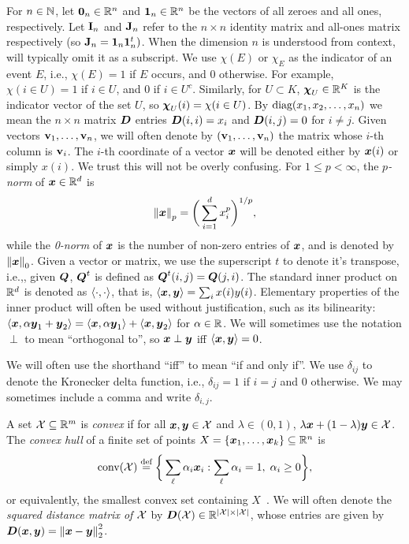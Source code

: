 For $n\in \mathbb{N}$, let $\vb{0}_n\in\mathbb{R}^n$ and $\vb{1}_n\in\mathbb{R}^n$ be the vectors of all zeroes and all ones, respectively. Let $\vb{I}_n$ and $\vb{J}_n$  refer to the $n\times n$ identity matrix and all-ones matrix respectively (so $\vb{J}_n=\vb{1}_n\vb{1}_n^t)$. When the dimension $n$ is understood from context, will typically omit it as a subscript. We use $\chi(E)$ or $\chi_E$ as the indicator of an event $E$, i.e., $\chi(E)=1$ if $E$ occurs, and 0 otherwise. For example, $\chi(i\in U)=1$ if $i\in U$, and 0 if $i\in U^c$.  Similarly, for $U\subset K$,  $\boldsymbol{\chi}_U\in\mathbb{R}^K$ is the indicator vector of the set $U$, so $\boldsymbol{\chi}_U(i)=\chi(i\in U)$. 
By $\text{diag}(x_1,x_2,\dots,x_n)$ we mean the $n\times n$ matrix $\vb*{D}$ entries $\vb*{D}(i,i)=x_i$ and $\vb*{D}(i,j)=0$ for $i\neq j$. Given vectors $\vb{v}_1,\dots,\vb{v}_n$, we will often denote by $(\vb{v}_1,\dots,\vb{v}_n)$ the matrix whose $i$-th column is $\vb{v}_i$. The $i$-th coordinate of a vector $\vb*{x}$ will be denoted either by $\vb*{x}(i)$ or simply $x(i)$. We trust this will not be overly confusing.  For $1\leq p<\infty$, the \emph{$p$-norm} of $\vb*{x}\in \mathbb{R}^d$ is 
\begin{equation}
\label{eq:pnorm}
\norm{\vb*{x}}_p = \bigg(\sum_{i=1}^d x_i^p\bigg)^{1/p},
\end{equation}
while the \emph{0-norm} of $\vb*{x}$ is the number of non-zero entries of $\vb*{x}$, and is denoted by $\norm{\vb*{x}}_0$.  Given a vector or matrix, we use the superscript $t$ to denote it's transpose, i.e.,, given $\vb*{Q}$, $\vb*{Q}^t$ is defined as $\vb*{Q}^t(i,j) = \vb*{Q}(j,i)$. The standard inner product on $\mathbb{R}^d$ is denoted as $\langle\cdot,\cdot\rangle$, that is, $\langle \vb*{x},\vb*{y}\rangle = \sum_i x(i)y(i)$. Elementary properties of the inner product will often be used without justification, such as its bilinearity: $\langle \vb*{x},\alpha\vb*{y}_1+\vb*{y}_2\rangle  = \langle \vb*{x},\alpha\vb*{y}_1\rangle + \langle \vb*{x},\vb*{y}_2\rangle$ for $\alpha\in\mathbb{R}$.  We will sometimes use the notation $\perp$ to mean ``orthogonal to'', so $\vb*{x}\perp\vb*{y}$ iff $\langle\vb*{x},\vb*{y}\rangle=0$. 

We will often use the shorthand ``iff'' to mean ``if and only if''. We use $\delta_{ij}$ to denote the Kronecker delta function, i.e., $\delta_{ij} = 1$ if $i=j$ and 0 otherwise. We may sometimes include a comma and write $\delta_{i,j}$. 

A set $\mathcal{X}\subseteq\mathbb{R}^m$ is \emph{convex} if for all $\vb*{x},\vb*{y}\in\mathcal{X}$ and $\lambda\in(0,1)$, $\lambda\vb*{x} + (1-\lambda)\vb*{y}\in \mathcal{X}$. 
The \emph{convex hull} of a finite set of points $X=\{\vb*{x}_1,\dots,\vb*{x}_k\}\subseteq \mathbb{R}^n$ is 
\begin{equation}
\label{eq:conv(X)}
\textnormal{conv}(\mathcal{X}) \overset{\text{def}}{=} \bigg\{\sum_\ell \alpha_i\vb*{x}_i: \sum_\ell \alpha_i = 1, \;\alpha_i\geq 0\bigg\},
\end{equation}
or equivalently, the smallest convex set containing $X$~\cite{grunbaum1967convex}. We will often denote the \emph{squared distance matrix of $\mathcal{X}$} by $\vb*{D}(\mathcal{X})\in\mathbb{R}^{|\mathcal{X}|\times |\mathcal{X}|}$,  whose entries are given by $\vb*{D}(\vb*{x},\vb*{y}) = \norm{\vb*{x}-\vb*{y}}_2^2$.  


